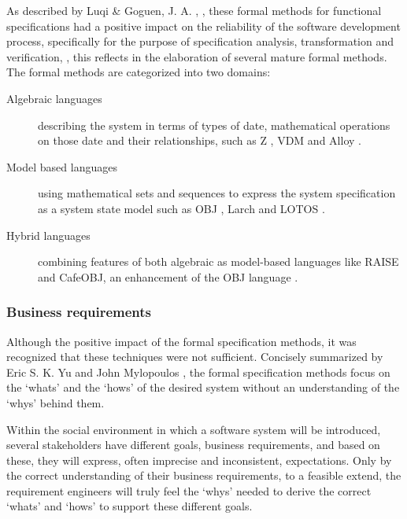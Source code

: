 As described by  Luqi \& Goguen, J. A. , , these formal methods for functional specifications had a positive impact on the reliability of the software development process, specifically for the purpose of specification analysis, transformation and verification, , this  reflects  in the elaboration of several mature formal methods.
The formal methods are categorized into two domains:

\begin{description}
	\item[Algebraic languages] describing the system in terms of types of date, mathematical operations on those date and their relationships, such as Z , VDM  and Alloy .
	\item[Model based languages] using mathematical sets and sequences to express the system specification as a system state model such as OBJ , Larch  and LOTOS .
	\item[Hybrid languages] combining features of both algebraic as model-based languages like RAISE  and CafeOBJ, an enhancement of the OBJ language .
\end{description}

\subsubsection{Business requirements}

Although the positive impact of the formal specification methods, it was recognized that these techniques were not sufficient. Concisely summarized by Eric S. K. Yu and John Mylopoulos , the formal specification methods focus on the `whats' and the  `hows' of the desired system without an understanding of the `whys' behind them. 

Within the social environment in which a software system will be introduced, several stakeholders have different goals,  business requirements, and based on these, they will express, often imprecise and inconsistent, expectations. Only by the correct understanding of their business requirements, to a feasible extend, the requirement engineers will truly feel the `whys' needed to derive the correct `whats' and `hows' to support these different goals.


